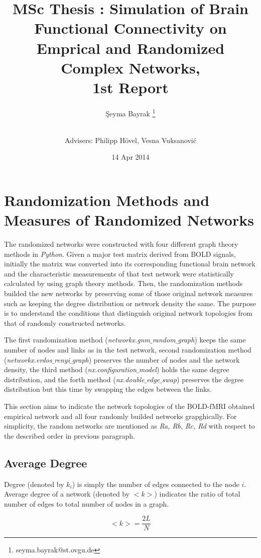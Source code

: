 \documentclass[12pt]{article}
\title{MSc Thesis : Simulation of Brain Functional Connectivity on Emprical and Randomized Complex Networks, \\ 1st Report}
\author[1]{\c{S}eyma Bayrak \thanks{seyma.bayrak@st.ovgu.de}}
\author[ ]{\\ Advisers: Philipp H\"{o}vel, Vesna Vuksanovi\'c}
\affil[1]{\footnotesize{Integrative Neuroscience MSc, Otto von Guericke University, Magdeburg}}
\date{14 Apr 2014}
\begin{document}
   \maketitle
   

	\section{Randomization Methods and Measures of Randomized Networks}	
	
The randomized networks were constructed with four different graph theory methods in  \textit{Python}. Given a major test matrix derived from BOLD signals, initially the matrix was converted into its corresponding functional brain network and the characteristic measurements of that test network were statistically calculated by using graph theory methods. Then, the randomization methods builded the new networks by preserving some of those original network measures such as keeping the degree distribution or network density the same. The purpose is to understand the conditions that distinguish original network topologies from that of randomly constructed networks.  

The first randomization method (\textit{networkx.gnm$\_$random$\_$graph}) keeps the same number of nodes and links as in the test network, second randomization method (\textit{networkx.erdos$\_$renyi$\_$graph}) preserves the number of nodes and the network density,  the third method (\textit{nx.configuration$\_$model}) holds the same degree distribution, and the forth method (\textit{nx.double$\_$edge$\_$swap}) preserves the degree distribution but this time by swapping the edges between the links. 
	
This section aims to indicate the network topologies of the BOLD-fMRI obtained empirical network and all four randomly builded networks grapghically. For simplicity, the random networks are mentioned as \textit{Ra, Rb, Rc, Rd} with respect to the described order in previous paragraph. 	

\subsection{Average Degree}

Degree (denoted by $k_i$) is simply the number of edges connected to the node $i$. Average degree of a network (denoted by $<k>$) indicates the ratio of total number of edges to total number of nodes in a graph.
 
\begin{equation}
<k> = \frac{2L}{N}
\end{equation} 
 
\end{document}
